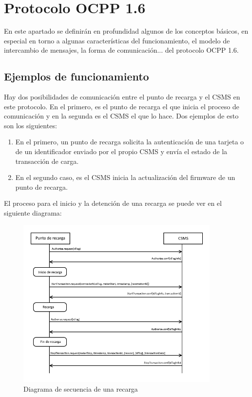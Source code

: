 \documentclass[12pt,a4paper,onecolumn,oneside]{report}
\begin{document}
\section{Protocolo OCPP 1.6}
\label{Protocolo OCPP 1.6}

En este apartado se definirán en profundidad algunos de los conceptos básicos, en especial en torno a algunas características del funcionamiento, el modelo de intercambio de mensajes, la forma de comunicación... del protocolo OCPP 1.6.


\subsection{Ejemplos de funcionamiento}
\label{Ejemplos de funcionamiento}

Hay dos posibilidades de comunicación entre el punto de recarga y el CSMS en este protocolo. En el primero, es el punto de recarga el que inicia el proceso de comunicación y en la segunda es el CSMS el que lo hace. Dos ejemplos de esto son los siguientes:

\begin{enumerate}

\item En el primero, un punto de recarga solicita la autenticación de una tarjeta o de un identificador enviado por el propio CSMS y envía el estado de la transacción de carga.

\item En el segundo caso, es el CSMS inicia la actualización del firmware de un punto de recarga.

\end{enumerate}

El proceso para el inicio y la detención de una recarga se puede ver en el siguiente diagrama:

\begin{figure}[h] 
\centering
  \includegraphics[width=0.9\textwidth]{figuras/diagramainiciofincarga.png}
  \caption[Diagrama de secuencia de una recarga]{Diagrama de secuencia de una recarga\\
  }
  \label{fig:diagramarecarga}
\end{figure}
\end{document}
